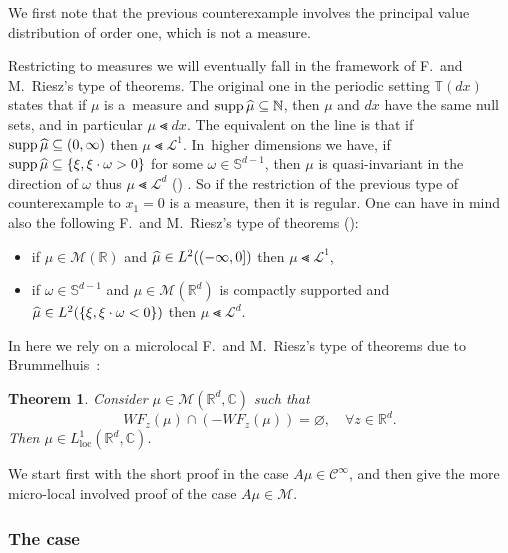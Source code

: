 \documentclass[10pt]{amsart}
\newtheorem{theo}{Theorem}[section]
\theoremstyle{definition}\newtheorem{defi}[theo]{Definition}\newtheorem{rema}[theo]{Remark}\newtheorem{exam}[theo]{Example}\newtheorem{exem}[theo]{Example}\newtheorem{nota}[theo]{Notation}
\DeclareMathOperator{\supp}{supp}
\DeclareMathOperator{\locc}{loc}
\newcommand{\bbC}{\mathbb{C}}
\newcommand{\bbN}{\mathbb{N}}
\newcommand{\bbT}{\mathbb{T}}
\newcommand{\bbR}{\mathbb{R}}
\newcommand{\bbS}{\mathbb{S}}
\newcommand{\clC}{\mathcal{C}}
\newcommand{\clM}{\mathcal{M}}
\newcommand{\clL}{\mathcal{L}}
\let\oldhat\hat
\renewcommand*{\hat}[1]{\mathchoice{\widehat{#1}}{\widehat{#1}}{\oldhat{#1}}{\oldhat{#1}}}
\let\oldforall\forall
\renewcommand*{\forall}{\mathrel{\oldforall}}
\begin{document}
We first note that the previous counterexample involves the principal value distribution of order one, which is not a measure.

Restricting to measures we will eventually fall in the framework of F.~and M.~Riesz's type of theorems. The original one in the periodic setting $\bbT(dx)$ states that if $\mu$ is a~measure and $\supp\hat{\mu}\subseteq \bbN$, then $\mu$ and $dx$ have the same null sets, and in particular $\mu\Lt dx$. The equivalent on the line is that if $\supp\hat{\mu}\subseteq (0,\infty)$ then $\mu\Lt \clL^1$. In~higher dimensions we have, if $\supp\hat{\mu}\subseteq \{\xi,\xi\cdot\omega>0\}$ for some $\omega\in\bbS^{d-1}$, then $\mu$ is quasi-invariant in the direction of $\omega$ thus $\mu\Lt \mathcal L^d$ (\cite{F}) . So if the restriction of the previous type of counterexample to $x_1=0$ is a measure, then it is regular. One can have in mind also the following F.~and M.~Riesz's type of theorems (\cite{Sh}):
\begin{itemize}
\item if $\mu\in\clM(\bbR)$ and $\hat\mu\in L^2((-\infty,0])$ then $\mu\Lt\clL^1$,
\item if $\omega\in\bbS^{d-1}$ and $\mu\in\clM(\bbR^d)$ is compactly supported and $\hat\mu\in L^2(\{\xi,\xi\cdot \omega<0\})$ then $\mu\Lt\clL^d$.
\end{itemize}
In here we rely on a microlocal F.~and M.~Riesz's type of theorems due to Brummelhuis~\cite{Br}:
\begin{theo} Consider $\mu\in\clM(\bbR^d,\bbC)$ such that
\begin{equation}\label{Br}
WF_z(\mu)\cap (-WF_z(\mu))=\varnothing,\quad \forall z\in\bbR^d.
\end{equation}
Then $\mu\in L^1_{\locc}(\bbR^d,\bbC)$.
\end{theo}

We start first with the short proof in the case $A\mu\in\clC^\infty$, and then give the more micro-local involved proof of the case $A\mu\in \clM$.

\subsubsection{The case \protect{\texorpdfstring{$A\mu\in\clC^\infty$}{A mu in C\^infty}}}
\end{document}
